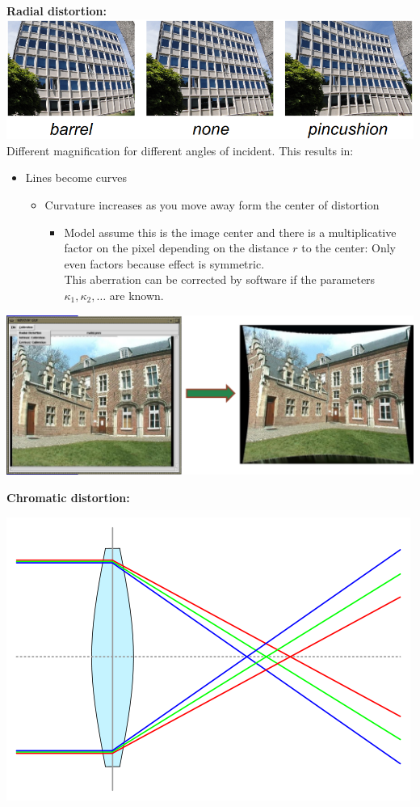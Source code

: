 \documentclass[a4paper, fontsize=8pt, landscape, DIV=1]{scrartcl}
\begin{document}
\begin{multicols*}{4}
		\textbf{Radial distortion:}\\
		\includegraphics[width=\columnwidth]{images//ImageAcq/radial_dist.png}\\
		Different magnification for different angles of incident. This results in: 
		\begin{itemize}
			\item Lines become curves
				\begin{itemize}[label={$\rightarrow$}]
					\item Curvature increases as you move away form the center of distortion
						\begin{itemize}[label={$\rightarrow$}]
							\item Model assume this is the image center and there is a multiplicative factor on the pixel depending on the distance $r$ to the center:
							\vspace{-0.4cm}
							Only even factors because effect is symmetric.\\
							This aberration can be corrected by software if the parameters $\kappa_1, \kappa_2, \dots$ are known.
						\end{itemize} 
				\end{itemize}
		\end{itemize}
		\includegraphics[width=\columnwidth]{images//ImageAcq/radial_dist_2.png}\\
		\par 
		\textbf{Chromatic distortion:}
		\begin{center}
			\includegraphics[width=0.7\columnwidth]{images//ImageAcq/chromatic_aberration.png}\\

\end{center}
\end{multicols*}
\end{document}
